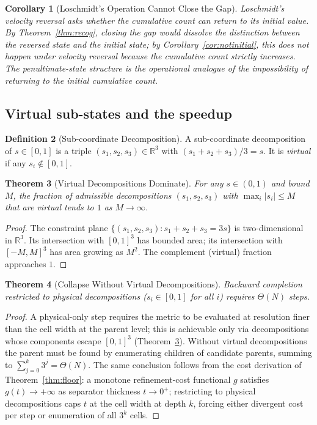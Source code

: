 \documentclass[twocolumn,10pt,a4paper]{article}
\theoremstyle{thmstyle}
\newtheorem{theorem}{Theorem}[section]
\newtheorem{corollary}[theorem]{Corollary}
\theoremstyle{definition}
\newtheorem{definition}[theorem]{Definition}
\theoremstyle{remark}
\newcommand{\R}{\mathbb{R}}
\begin{document}
\begin{corollary}[Loschmidt's Operation Cannot Close the Gap]
\label{cor:losch_gap}
Loschmidt's velocity reversal asks whether the cumulative count can
return to its initial value. By Theorem~\ref{thm:recog}, closing the
gap would dissolve the distinction between the reversed state and the
initial state; by Corollary~\ref{cor:notinitial}, this does not happen
under velocity reversal because the cumulative count strictly
increases. The penultimate-state structure is the operational analogue
of the impossibility of returning to the initial cumulative count.
\end{corollary}

\subsection{Virtual sub-states and the speedup}

\begin{definition}[Sub-coordinate Decomposition]
\label{def:sub}
A sub-coordinate decomposition of $s\in[0,1]$ is a triple
$(s_{1},s_{2},s_{3})\in\R^{3}$ with $(s_{1}+s_{2}+s_{3})/3=s$. It is
\emph{virtual} if any $s_{i}\notin[0,1]$.
\end{definition}

\begin{theorem}[Virtual Decompositions Dominate]
\label{thm:virt}
For any $s\in(0,1)$ and bound $M$, the fraction of admissible
decompositions $(s_{1},s_{2},s_{3})$ with $\max_{i}|s_{i}|\leq M$
that are virtual tends to $1$ as $M\to\infty$.
\end{theorem}

\begin{proof}
The constraint plane $\{(s_{1},s_{2},s_{3}):s_{1}+s_{2}+s_{3}=3s\}$
is two-dimensional in $\R^{3}$. Its intersection with $[0,1]^{3}$ has
bounded area; its intersection with $[-M,M]^{3}$ has area growing as
$M^{2}$. The complement (virtual) fraction approaches $1$.
\end{proof}

\begin{theorem}[Collapse Without Virtual Decompositions]
\label{thm:collapse}
Backward completion restricted to physical decompositions
($s_{i}\in[0,1]$ for all $i$) requires $\Theta(N)$ steps.
\end{theorem}

\begin{proof}
A physical-only step requires the metric to be evaluated at resolution
finer than the cell width at the parent level; this is achievable only
via decompositions whose components escape $[0,1]^{3}$
(Theorem~\ref{thm:virt}). Without virtual decompositions the parent
must be found by enumerating children of candidate parents, summing
to $\sum_{j=0}^{k}3^{j}=\Theta(N)$. The same conclusion follows from
the cost derivation of Theorem~\ref{thm:floor}: a monotone
refinement-cost functional $g$ satisfies $g(t)\to+\infty$ as
separator thickness $t\to 0^{+}$; restricting to physical
decompositions caps $t$ at the cell width at depth $k$, forcing
either divergent cost per step or enumeration of all $3^{k}$ cells.
\end{proof}
\end{document}
